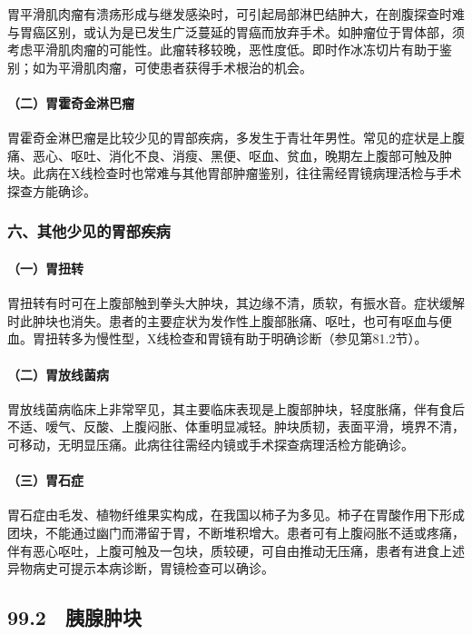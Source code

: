 胃平滑肌肉瘤有溃疡形成与继发感染时，可引起局部淋巴结肿大，在剖腹探查时难与胃癌区别，或认为是已发生广泛蔓延的胃癌而放弃手术。如肿瘤位于胃体部，须考虑平滑肌肉瘤的可能性。此瘤转移较晚，恶性度低。即时作冰冻切片有助于鉴别；如为平滑肌肉瘤，可使患者获得手术根治的机会。

\paragraph{（二）胃霍奇金淋巴瘤}

胃霍奇金淋巴瘤是比较少见的胃部疾病，多发生于青壮年男性。常见的症状是上腹痛、恶心、呕吐、消化不良、消瘦、黑便、呕血、贫血，晚期左上腹部可触及肿块。此病在X线检查时也常难与其他胃部肿瘤鉴别，往往需经胃镜病理活检与手术探查方能确诊。

\subsubsection{六、其他少见的胃部疾病}

\paragraph{（一）胃扭转}

胃扭转有时可在上腹部触到拳头大肿块，其边缘不清，质软，有振水音。症状缓解时此肿块也消失。患者的主要症状为发作性上腹部胀痛、呕吐，也可有呕血与便血。胃扭转多为慢性型，X线检查和胃镜有助于明确诊断（参见第81.2节）。

\paragraph{（二）胃放线菌病}

胃放线菌病临床上非常罕见，其主要临床表现是上腹部肿块，轻度胀痛，伴有食后不适、嗳气、反酸、上腹闷胀、体重明显减轻。肿块质韧，表面平滑，境界不清，可移动，无明显压痛。此病往往需经内镜或手术探查病理活检方能确诊。

\paragraph{（三）胃石症}

胃石症由毛发、植物纤维果实构成，在我国以柿子为多见。柿子在胃酸作用下形成团块，不能通过幽门而滞留于胃，不断堆积增大。患者可有上腹闷胀不适或疼痛，伴有恶心呕吐，上腹可触及一包块，质较硬，可自由推动无压痛，患者有进食上述异物病史可提示本病诊断，胃镜检查可以确诊。

\subsection{99.2　胰腺肿块}

